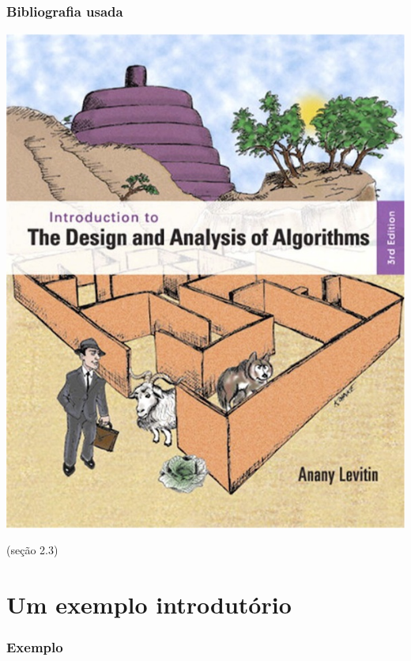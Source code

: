 \documentclass[handout]{beamer}
\begin{document}
\begin{frame}

  \frametitle{Bibliografia usada}

  \begin{center}
    \includegraphics[height=.8\textheight]{img/capa-levitin.jpg}
  \end{center}
  (seção 2.3)
\end{frame}

\section{Um exemplo introdutório}

\begin{frame}
  \frametitle{Exemplo}

  \begin{example}
    
  \end{example}
\end{frame}
\end{document}
